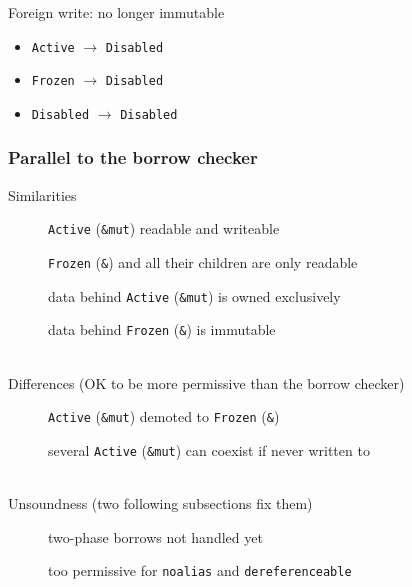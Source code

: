 \begin{frame}[t]
\begin{onlyenv}
        \begin{block}{Foreign write: no longer immutable}
            \begin{itemize}
                \item \texttt{Active} \(\to\) \texttt{Disabled}
                \item \texttt{Frozen} \(\to\) \texttt{Disabled}
                \item \texttt{Disabled} \(\to\) \texttt{Disabled}
            \end{itemize}
        \end{block}
    \end{onlyenv}
\end{frame}

\begin{frame}
    \frametitle{Parallel to the borrow checker}
    Similarities
    \hspace{-5em}
    \begin{description}
        \item[\cmark] \texttt{Active} (\texttt{\&mut}) readable and writeable
        \item[\cmark] \texttt{Frozen} (\texttt{\&}) and all their children are only readable
        \item[\cmark] data behind \texttt{Active} (\texttt{\&mut}) is owned exclusively
        \item[\cmark] data behind \texttt{Frozen} (\texttt{\&}) is immutable
    \end{description}~\\

    Differences (OK to be more permissive than the borrow checker)
    \hspace{-5em}
    \begin{description}
        \item[\xmark] \texttt{Active} (\texttt{\&mut}) demoted to \texttt{Frozen} (\texttt{\&})
        \item[\xmark] several \texttt{Active} (\texttt{\&mut}) can coexist if never written to
    \end{description}~\\

    Unsoundness (two following subsections fix them)
    \hspace{-5em}
    \begin{description}
        \item[\xmark] two-phase borrows not handled yet
        \item[\xmark] too permissive for \texttt{noalias} and \texttt{dereferenceable}
    \end{description}~\\

\end{frame}

